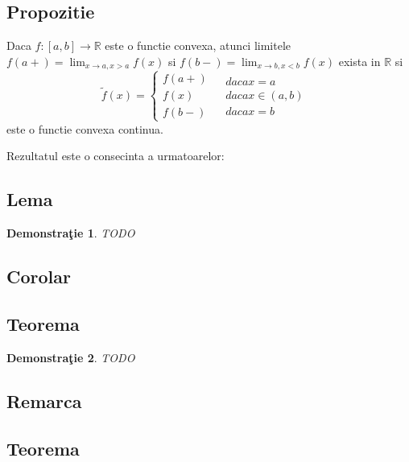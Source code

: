 \documentclass[a4paper,12pt,oneside]{report}
\newtheorem{demonstration}{Demonstra\c tie}
\begin{document}
\subsection{Propozitie}
Daca \(f: \left [ a, b \right ]\rightarrow \mathbb{R}\) este o functie convexa, atunci limitele \(f\left ( a+ \right ) = \lim_{x\rightarrow a, x> a}f\left ( x \right )\)  si \(f\left ( b- \right ) = \lim_{x\rightarrow b, x< b}f\left ( x \right )\) exista in \(\mathbb{R}\) si
\begin{displaymath}
  \tilde{f}\left ( x \right )= \left\{\begin{matrix}
f\left ( a+ \right ) & \\ 
 f\left ( x \right )& \\ 
 f\left ( b- \right )& 
\end{matrix} \begin{matrix}
daca x= a & \\ 
daca x\in \left ( a,b \right ) & \\ 
 daca x= b& 
\end{matrix}\right.
\end{displaymath}
 este o functie convexa continua. 

Rezultatul este o consecinta a urmatoarelor:	


\subsection{Lema}

\begin{demonstration}
TODO	
\end{demonstration}


\subsection{Corolar}

\subsection{Teorema}

\begin{demonstration}
TODO	
\end{demonstration}


\subsection{Remarca}

\subsection{Teorema}
\end{document}
